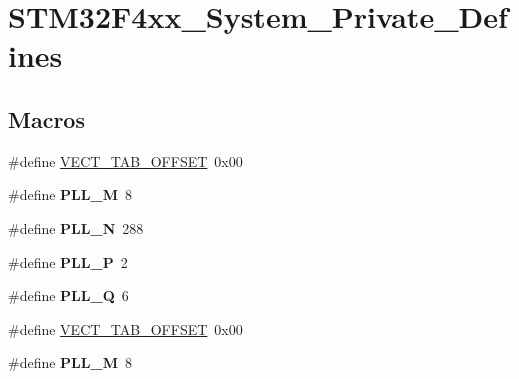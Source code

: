 \hypertarget{group___s_t_m32_f4xx___system___private___defines}{\section{S\-T\-M32\-F4xx\-\_\-\-System\-\_\-\-Private\-\_\-\-Defines}
\label{group___s_t_m32_f4xx___system___private___defines}
}
\subsection*{Macros}
\begin{DoxyCompactItemize}
\item 
\#define \hyperlink{group___s_t_m32_f4xx___system___private___defines_ga40e1495541cbb4acbe3f1819bd87a9fe}{V\-E\-C\-T\-\_\-\-T\-A\-B\-\_\-\-O\-F\-F\-S\-E\-T}~0x00
\item 
\hypertarget{group___s_t_m32_f4xx___system___private___defines_ga0fa5a868f5cd056a04b1c42e454b9617}{\#define {\bfseries P\-L\-L\-\_\-\-M}~8}\label{group___s_t_m32_f4xx___system___private___defines_ga0fa5a868f5cd056a04b1c42e454b9617}

\item 
\hypertarget{group___s_t_m32_f4xx___system___private___defines_ga04586ea638d21afe558db4f2798c38a6}{\#define {\bfseries P\-L\-L\-\_\-\-N}~288}\label{group___s_t_m32_f4xx___system___private___defines_ga04586ea638d21afe558db4f2798c38a6}

\item 
\hypertarget{group___s_t_m32_f4xx___system___private___defines_ga290dcd27167e925d817e8334111c1c01}{\#define {\bfseries P\-L\-L\-\_\-\-P}~2}\label{group___s_t_m32_f4xx___system___private___defines_ga290dcd27167e925d817e8334111c1c01}

\item 
\hypertarget{group___s_t_m32_f4xx___system___private___defines_gac958257ddb2537c539cffdb3a4543067}{\#define {\bfseries P\-L\-L\-\_\-\-Q}~6}\label{group___s_t_m32_f4xx___system___private___defines_gac958257ddb2537c539cffdb3a4543067}

\item 
\#define \hyperlink{group___s_t_m32_f4xx___system___private___defines_ga40e1495541cbb4acbe3f1819bd87a9fe}{V\-E\-C\-T\-\_\-\-T\-A\-B\-\_\-\-O\-F\-F\-S\-E\-T}~0x00
\item 
\hypertarget{group___s_t_m32_f4xx___system___private___defines_ga0fa5a868f5cd056a04b1c42e454b9617}{\#define {\bfseries P\-L\-L\-\_\-\-M}~8}\label{group___s_t_m32_f4xx___system___private___defines_ga0fa5a868f5cd056a04b1c42e454b9617}


\end{DoxyCompactItemize}
